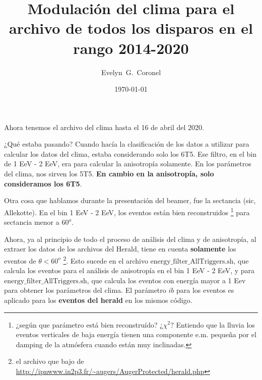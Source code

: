 



\title{Modulación del clima para el archivo de todos los disparos en el rango 2014-2020}
\author{Evelyn~G.~Coronel}


\date[]{\lowercase{\today}} %


\maketitle

Ahora tenemos el archivo del clima hasta el 16 de abril del 2020.

¿Qué estaba pasando? Cuando hacía la clasificación de los datos a utilizar para calcular los datos del clima, estaba considerando solo los 6T5. Ese filtro, en el bin de 1 EeV - 2 EeV, era para calcular la anisotropía solamente. En los parámetros del clima, nos sirven los 5T5. \textbf{En cambio en la anisotropía, solo consideramos los 6T5}.


Otra cosa que hablamos durante la presentación del beamer, fue la sectancia (sic, Allekotte). En el bin 1 EeV - 2 EeV, los eventos están bien reconstruidos \footnote{¿según que parámetro está bien reconstruído? ¿$\chi^2$? Entiendo que la lluvia los eventos verticales de baja energía tienen una componente e.m. pequeña por el damping de la atmósfera cuando están muy inclinadas.} para sectancia menor a $60^o$.


Ahora, ya al principio de todo el proceso de análisis del clima y de anisotropía, al extraer los datos de los archivos del Herald, tiene en cuenta \textbf{solamente} los eventos de $\theta < 60^o$ \footnote{el archivo que bajo de \url{http://ipnwww.in2p3.fr/~augers/AugerProtected/herald.php} }. Esto sucede en el archivo $\text{energy\_filter\_AllTriggers.sh}$, que calcula los eventos para el análisis de anisotropía en el bin 1 EeV - 2 EeV, y para $\text{energy\_filter\_AllTriggers.sh}$, que calcula los eventos con energía mayor a 1 Eev para obtener los parámetros del clima. El parámetro $ib$ para los eventos es aplicado para los \textbf{eventos del herald } en los mismos código. 

